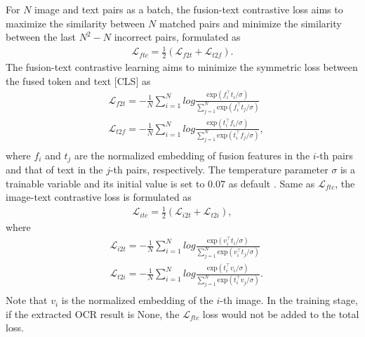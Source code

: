 \documentclass[10pt,twocolumn,letterpaper]{article}
\begin{document}
For $N$ image and text pairs as a batch, the fusion-text contrastive loss aims to maximize the similarity between $N$ matched pairs and minimize the similarity between the last $N^2-N$ incorrect pairs, formulated as\vspace{-0.5em} 
\begin{equation}
\begin{aligned}
    \mathcal{L}_{ftc} = \frac{1}{2} (\mathcal{L}_{f2t} + \mathcal{L}_{t2f}).
\end{aligned}
\end{equation}
The fusion-text contrastive learning aims to minimize the symmetric loss between the fused token and text [CLS] as\vspace{-0.5em}
\begin{equation}
\begin{aligned}
    &\mathcal{L}_{f2t} = - \frac{1}{N} \sum_{i=1}^{N} log \frac{\mathrm{exp}(f^\top_i t_i / \sigma)}{\sum_{j=1}^{N} \mathrm{exp}(f^\top_i t_j / \sigma )} \\
    &\mathcal{L}_{t2f} = - \frac{1}{N} \sum_{i=1}^{N} log \frac{\mathrm{exp}(t^\top_i f_i / \sigma)}{\sum_{j=1}^{N} \mathrm{exp}(t^\top_i f_j / \sigma )}, \\
\end{aligned}
\end{equation}
where $f_i$ and $t_j$ are the normalized embedding of fusion features in the $i$-th pairs and that of text in the $j$-th pairs, respectively. The temperature parameter $\sigma$ is a trainable variable and its initial value is set to $0.07$ as default \cite{ALIGN}. 
Same as $\mathcal{L}_{ftc}$, the image-text contrastive loss is formulated as \vspace{-0.5em}
\begin{equation}
\begin{aligned}
    \mathcal{L}_{itc} = \frac{1}{2} (\mathcal{L}_{i2t} + \mathcal{L}_{t2i}),
\end{aligned}
\end{equation}\vspace{-0.5em}
where\vspace{-1em}
\begin{equation}
\begin{aligned}
    &\mathcal{L}_{i2t} = - \frac{1}{N} \sum_{i=1}^{N} log \frac{\mathrm{exp}(v^\top_i t_i / \sigma)}{\sum_{j=1}^{N} \mathrm{exp}(v^\top_i t_j / \sigma )} \\
    &\mathcal{L}_{t2i} = - \frac{1}{N} \sum_{i=1}^{N} log \frac{\mathrm{exp}(t^\top_i v_i / \sigma)}{\sum_{j=1}^{N} \mathrm{exp}(t^\top_i v_j / \sigma )}. \\
\end{aligned}
\end{equation}
Note that $v_i$ is the normalized embedding of the $i$-th image. In the training stage, if the extracted OCR result is None, the $\mathcal{L}_{ftc}$ loss would not be added to the total loss. 
\end{document}

